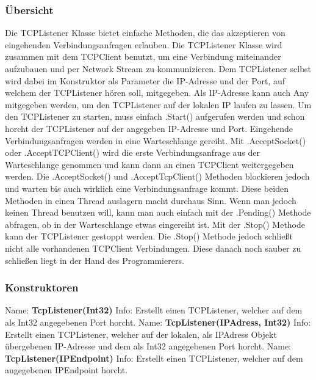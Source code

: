 \subsubsection{Übersicht}
Die TCPListener Klasse bietet einfache Methoden, die das akzeptieren von eingehenden Verbindungsanfragen erlauben. Die TCPListener Klasse wird zusammen mit dem TCPClient benutzt, um eine Verbindung miteinander aufzubauen und per Network Stream zu kommunizieren. Dem TCPListener selbst wird dabei im Konstruktor als Parameter die IP-Adresse und der Port, auf welchem der TCPListener hören soll, mitgegeben. Als IP-Adresse kann auch Any mitgegeben werden, um den TCPListener auf der lokalen IP laufen zu lassen. Um den TCPListener zu starten, muss einfach .Start() aufgerufen werden und schon horcht der TCPListener auf der angegeben IP-Adresse und Port. Eingehende Verbindungsanfragen werden in eine Warteschlange gereiht. Mit .AcceptSocket() oder .AcceptTCPClient() wird die erste Verbindungsanfrage aus der Warteschlange genommen und kann dann an einen TCPClient weitergegeben werden. Die .AcceptSocket() und .AcceptTcpClient() Methoden blockieren jedoch und warten bis auch wirklich eine Verbindungsanfrage kommt. Diese beiden Methoden in einen Thread auslagern macht durchaus Sinn. Wenn man jedoch keinen Thread benutzen will, kann man auch einfach mit der .Pending() Methode abfragen, ob in der Warteschlange etwas eingereiht ist. Mit der .Stop() Methode kann der TCPListener gestoppt werden. Die .Stop() Methode jedoch schließt nicht alle vorhandenen TCPClient Verbindungen. Diese danach noch sauber zu schließen liegt in der Hand des Programmierers.
\subsubsection{Konstruktoren}
Name: \textbf{TcpListener(Int32)}
\newline
Info: Erstellt einen TCPListener, welcher auf dem als Int32 angegebenen Port horcht.
\newline \newline
Name: \textbf{TcpListener(IPAdress, Int32)}
\newline
Info:  Erstellt einen TCPListener, welcher auf der lokalen, als IPAdress Objekt übergebenen IP-Adresse und dem als Int32 angegebenen Port horcht.
\newline \newline
Name: \textbf{TcpListener(IPEndpoint)}
\newline
Info: Erstellt einen TCPListener, welcher auf dem angegebenen IPEndpoint horcht.
\newline \newline
